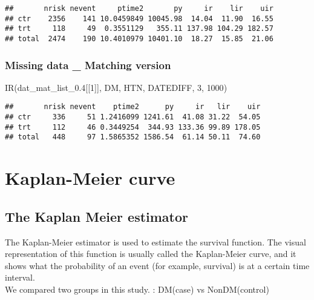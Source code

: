\documentclass[
]{book}
\newenvironment{Shaded}{\begin{snugshade}}{\end{snugshade}}
\newcommand{\DecValTok}[1]{\textcolor[rgb]{0.00,0.00,0.81}{#1}}
\newcommand{\FloatTok}[1]{\textcolor[rgb]{0.00,0.00,0.81}{#1}}
\newcommand{\FunctionTok}[1]{\textcolor[rgb]{0.00,0.00,0.00}{#1}}
\newcommand{\NormalTok}[1]{#1}
\begin{document}
\begin{verbatim}
##       nrisk nevent     ptime2       py     ir    lir    uir
## ctr    2356    141 10.0459849 10045.98  14.04  11.90  16.55
## trt     118     49  0.3551129   355.11 137.98 104.29 182.57
## total  2474    190 10.4010979 10401.10  18.27  15.85  21.06
\end{verbatim}

\hypertarget{missing-data-_-matching-version}{%
\subsection{Missing data \_ Matching version}\label{missing-data-_-matching-version}}

\begin{Shaded}
\begin{Highlighting}[]
\FunctionTok{IR}\NormalTok{(dat\_mat\_list\_0}\FloatTok{.4}\NormalTok{[[}\DecValTok{1}\NormalTok{]], DM, HTN, DATEDIFF, }\DecValTok{3}\NormalTok{, }\DecValTok{1000}\NormalTok{)}
\end{Highlighting}
\end{Shaded}

\begin{verbatim}
##       nrisk nevent    ptime2      py     ir   lir    uir
## ctr     336     51 1.2416099 1241.61  41.08 31.22  54.05
## trt     112     46 0.3449254  344.93 133.36 99.89 178.05
## total   448     97 1.5865352 1586.54  61.14 50.11  74.60
\end{verbatim}

\hypertarget{kaplan-meier-curve}{%
\chapter{Kaplan-Meier curve}\label{kaplan-meier-curve}}

\hypertarget{the-kaplan-meier-estimator}{%
\section{The Kaplan Meier estimator}\label{the-kaplan-meier-estimator}}

The Kaplan-Meier estimator is used to estimate the survival function. The visual representation of this function is usually called the Kaplan-Meier curve, and it shows what the probability of an event (for example, survival) is at a certain time interval.\\
We compared two groups in this study. : DM(case) vs NonDM(control)\\
\end{document}
